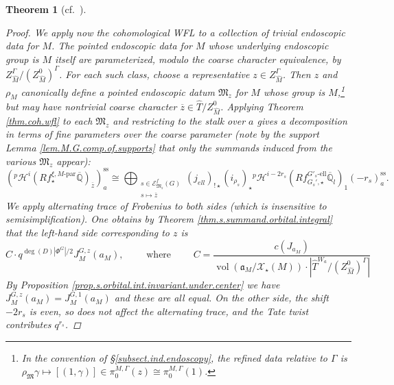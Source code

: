 \documentclass[openany]{amsbook}
\newtheorem{theorem}{Theorem}[chapter]
\theoremstyle{definition}
\theoremstyle{remark}
\numberwithin{equation}{section}
\newcommand{\Q}{\mathbb{Q}}
\newcommand{\cE}{\mathcal{E}}
\newcommand{\cX}{\mathcal{X}}
\newcommand{\ol}[1]{\overline{#1}}
\newcommand{\vol}{\operatorname{vol}}
\renewcommand{\-}{\operatorname{-}}
\renewcommand{\a}{\mathfrak{a}}
\newcommand{\pHi}{{}^p \mathcal{H}^i}
\newcommand{\pHishift}{{}^p \mathcal{H}^{i - 2r_s}}
\newcommand{\el}{\text{-ell}}
\newcommand{\fM}{\mathfrak{M}}
\newcommand{\Mpar}{M\text{-par}}
\renewcommand{\ss}{\mathrm{ss}}
\begin{document}
\begin{theorem}[{cf.\ \cite[Th\'eor\`eme 14.1.1]{CLII}}]
\begin{proof}
    We apply now the cohomological WFL to a collection of trivial endoscopic data for $M$. The pointed endoscopic data for $M$ whose underlying endoscopic group is $M$ itself are parameterized, modulo the coarse character equivalence, by $Z_{\widehat{M}}^\Gamma/(Z_{\widehat{M}}^0)^\Gamma$. For each such class, choose a representative $z \in Z_{\widehat{M}}^\Gamma$. Then $z$ and $\rho_M$ canonically define a pointed endoscopic datum $\fM_z$ for $M$ whose group is $M$,\footnote{In the convention of \S \ref{subsect.ind.endoscopy}, the refined data relative to $\Gamma$ is $\rho_{\fM} \gamma \mapsto [(1, \gamma)] \in \pi_0^{M,\Gamma}(z) \cong \pi_0^{M,\Gamma}(1)$. } but may have nontrivial coarse character $\ol{z} \in \widehat{T}/Z_{\widehat{M}}^0$. Applying Theorem \ref{thm.coh.wfl} to each $\fM_z$ and restricting to the stalk over $a$ gives a decomposition in terms of fine parameters over the coarse parameter (note by the support Lemma \ref{lem.M.G.comp.of.supports} that only the summands induced from the various $\fM_z$ appear):
    \begin{equation}
        (\pHi(R f_\star^{\xi, \Mpar} \ol{\Q})_{\ol{z}})_{a}^{\ss} \cong \bigoplus_{\substack{s \in \cE_{\fM_z}^f(G)\\ s\mapsto \ol{z}}} (j_{ell})_{!\star} (i_{\rho_s})_\star \pHishift(R f_{G_s', \star}^{G'_s \el} \ol{\Q}_l)_1(-r_s)_{a}^{\ss}.\label{eqn.stalk.wfl}
    \end{equation}
    We apply alternating trace of Frobenius to both sides (which is insensitive to semisimplification). One obtains by Theorem \ref{thm.s.summand.orbital.integral} that the left-hand side corresponding to $z$ is
    $$
        C \cdot q^{\deg(D) |\Phi^G|/2} J^{G,z}_M(a_M), \qquad \text{ where } \qquad C = \frac{c(J_{a_M})}{\vol(\a_M/\cX_\star(M)) \cdot |\widehat{T}^{W_a}/(Z_{\widehat{M}}^0)^\Gamma|}
    $$
    By Proposition \ref{prop.s.orbital.int.invariant.under.center} we have $J^{G,z}_M(a_M) = J^{G,1}_M(a_M)$ and these are all equal. On the other side, the shift $-2r_s$ is even, so does not affect the alternating trace, and the Tate twist contributes $q^{r_s}$. 
    

\end{proof}
\end{theorem}
\end{document}
